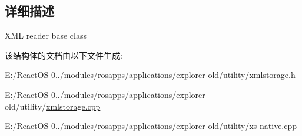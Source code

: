 \subsection{详细描述}
X\+ML reader base class 

该结构体的文档由以下文件生成\+:\begin{DoxyCompactItemize}
\item 
E\+:/\+React\+O\+S-\/0../modules/rosapps/applications/explorer-\/old/utility/\hyperlink{xmlstorage_8h}{xmlstorage.\+h}\item 
E\+:/\+React\+O\+S-\/0../modules/rosapps/applications/explorer-\/old/utility/\hyperlink{xmlstorage_8cpp}{xmlstorage.\+cpp}\item 
E\+:/\+React\+O\+S-\/0../modules/rosapps/applications/explorer-\/old/utility/\hyperlink{xs-native_8cpp}{xs-\/native.\+cpp}\end{DoxyCompactItemize}
